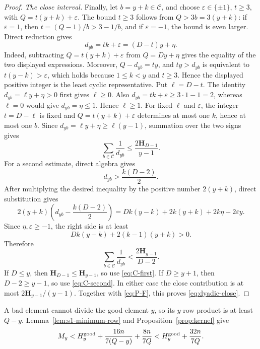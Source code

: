 \documentclass[11pt]{article}
\theoremstyle{definition}
\theoremstyle{remark}
\newcommand{\Harm}{\mathbf H}
\begin{document}
\begin{proof}
\smallskip
\noindent\emph{The close interval.}
Finally, let \(b=y+k\in\mathcal C\), and choose
\(\varepsilon\in\{\pm1\}\), \(t\ge3\), with
\(Q=t(y+k)+\varepsilon\).  The bound \(t\ge3\) follows from
\(Q>3b=3(y+k)\): if \(\varepsilon=1\), then
\(t=(Q-1)/b>3-1/b\), and if \(\varepsilon=-1\), the bound is even
larger.  Direct reduction gives
\[
 d_{yb}=tk+\varepsilon=(D-t)y+\eta.
\]
Indeed, subtracting \(Q=t(y+k)+\varepsilon\) from
\(Q=Dy+\eta\) gives the equality of the two displayed expressions.
Moreover, \(Q-d_{yb}=ty\), and
\(ty>d_{yb}\) is equivalent to \(t(y-k)>\varepsilon\), which holds
because \(1\le k<y\) and \(t\ge3\).  Hence the displayed positive
integer is the least cyclic representative.  Put \(\ell=D-t\).  The
identity \(d_{yb}=\ell y+\eta>0\) first gives \(\ell\ge0\).  Also
\(d_{yb}=tk+\varepsilon\ge3\cdot1-1=2\), whereas \(\ell=0\) would give
\(d_{yb}=\eta\le1\).  Hence \(\ell\ge1\).
For fixed \(\ell\) and \(\varepsilon\), the integer \(t=D-\ell\) is
fixed and \(Q=t(y+k)+\varepsilon\) determines at most one \(k\), hence at
most one \(b\).  Since \(d_{yb}=\ell y+\eta\ge\ell(y-1)\), summation over
the two signs gives
\begin{equation}\label{eq:C-first}
 \sum_{b\in\mathcal C}\frac1{d_{yb}}
 \le\frac{2\Harm_{D-1}}{y-1}.
\end{equation}
For a second estimate, direct algebra gives
\[
 d_{yb}>\frac{k(D-2)}2.
\]
After multiplying the desired inequality by the positive number
\(2(y+k)\), direct substitution gives
\[
 2(y+k)\left(d_{yb}-\frac{k(D-2)}2\right)
 =Dk(y-k)+2k(y+k)+2k\eta+2\varepsilon y.
\]
Since \(\eta,\varepsilon\ge-1\), the right side is at least
\[
 Dk(y-k)+2(k-1)(y+k)>0.
\]
Therefore
\begin{equation}\label{eq:C-second}
 \sum_{b\in\mathcal C}\frac1{d_{yb}}
 <\frac{2\Harm_{y-1}}{D-2}.
\end{equation}
If \(D\le y\), then \(\Harm_{D-1}\le\Harm_{y-1}\), so use
\eqref{eq:C-first}.  If \(D\ge y+1\), then \(D-2\ge y-1\), so use
\eqref{eq:C-second}.  In either case the close contribution is at most
\(2\Harm_{y-1}/(y-1)\).  Together with
\eqref{eq:P-F}, this proves \eqref{eq:dyadic-close}.
\end{proof}

A bad element cannot divide the good element \(y\), so its \(y\)-row
product is at least \(Q-y\).  Lemma~\ref{lem:s1-minimum-row} and
Proposition~\ref{prop:kernel} give
\begin{equation}\label{eq:y-full-envelope}
 M_y<H_y^{\rm good}+\frac{16n}{7(Q-y)}+\frac{8n}{7Q}
 <H_y^{\rm good}+\frac{32n}{7Q}.
\end{equation}
\end{document}
